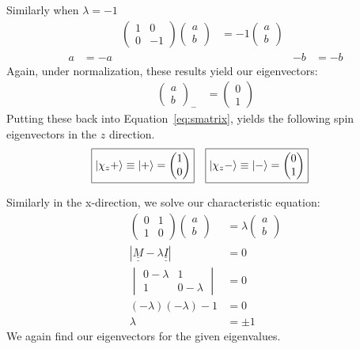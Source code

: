 \documentclass{jhwhw}
\begin{document}
Similarly when $\lambda = -1$
\begin{align}
	&&\begin{pmatrix}
		1	&	0	\\
		0	&	-1
	\end{pmatrix}
	\begin{pmatrix}
		a	\\
		b
	\end{pmatrix}
	&=
	-1
	\begin{pmatrix}
		a	\\
		b
	\end{pmatrix}
	&&
	\\
	 a &= -a &&& -b &= -b
\end{align}
Again, under normalization, these results yield our eigenvectors:
\begin{align}
	\begin{pmatrix}
		a	\\
		b
	\end{pmatrix}_-
	&=
	\begin{pmatrix}
		0	\\
		1
	\end{pmatrix}
\end{align}
Putting these back into Equation~\eqref{eq:smatrix}, yields the following spin eigenvectors in the $z$ direction.
\begin{align}
	\Aboxed{
	\ket{\chi_z +} &\equiv 
	\ket{+} = 
	\begin{pmatrix}
		1 \\
		0
	\end{pmatrix}}
	&
	\Aboxed{
	\ket{\chi_z -} &\equiv 
	\ket{-} = 
	\begin{pmatrix}
		0 \\
		1
	\end{pmatrix}}
\end{align}

Similarly in the x-direction, we solve our characteristic equation:
\begin{align}
	\begin{pmatrix}
		0	&	1	\\
		1	&	0
	\end{pmatrix}
	\begin{pmatrix}
		a	\\
		b
	\end{pmatrix}
	&=
	\lambda
	\begin{pmatrix}
		a	\\
		b
	\end{pmatrix}
	\\
	\left|\underline{\underline{M}} - \lambda \underline{\underline{I}}\right| &= 0
	\\
	\begin{vmatrix}
		0-\lambda	&	1		\\
		1			&	0 - \lambda
	\end{vmatrix}
	&=
	0
	\\
	(-\lambda)(-\lambda)-1 &= 0
	\\
	\lambda &= \pm 1
\end{align}
We again find our eigenvectors for the given eigenvalues.
\end{document}
